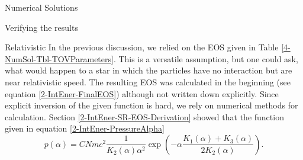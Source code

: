 \begin{section}{Numerical Solutions}
\begin{subsection}{Verifying the results}
% 
\end{subsection}
%
%
\begin{subsection}{Relativistic }
\label{4-NumSol-Sec-RelEOS}
In the previous discussion, we relied on the EOS given in Table \ref{4-NumSol-Tbl-TOVParameters}. 
This is a versatile assumption, but one could ask, what would happen to a star in which the particles have no interaction but are near relativistic speed. The resulting EOS was calculated in the beginning (see equation \eqref{2-IntEner-FinalEOS}) although not written down explicitly. 
Since explicit inversion of the given function is hard, we rely on numerical methods for calculation.
Section \ref{2-IntEner-SR-EOS-Derivation} showed that the function given in equation \eqref{2-IntEner-PressureAlpha}
\begin{equation}
	p(\alpha) = CNmc^2\frac{1}{K_2(\alpha)\alpha^2}\exp\left(-\alpha\frac{K_1(\alpha)+K_3(\alpha)}{2K_2(\alpha)}\right).
\end{equation}

\end{subsection}
\end{section}
